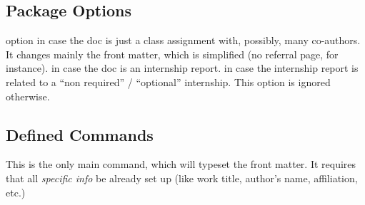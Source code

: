 \documentclass[article,nogeometry,english,tocdepth=3,secdepth=3]{ufrgscca} %
\begin{document}
\subsection{Package Options}
\begin{describelist}{option}
	 { in case the doc is just a class assignment with, possibly, many co-authors. It changes mainly the front matter, which is simplified (no referral page, for instance).}
     { in case the doc is an internship report.}
     { in case the internship report is related to a “non required” / “optional” internship. This option is ignored otherwise.}

\end{describelist}

\subsection{Defined Commands}
\begin{codedescribe}{\maketitle}
	\begin{codesyntax}%
		\tsmacro{\maketitle}{}
	\end{codesyntax}
This is the only main command, which will typeset the front matter. It requires that all \emph{specific info} be already set up (like work title, author's name, affiliation, etc.)
\end{codedescribe}


\end{document}
